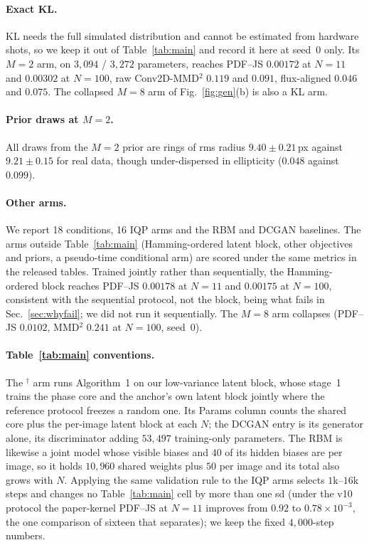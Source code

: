 \documentclass{article}
\begin{document}
\paragraph{Exact KL.} KL needs the full simulated distribution and cannot be estimated from hardware
shots, so we keep it out of Table~\ref{tab:main} and record it here at seed~0 only. Its $M{=}2$ arm,
on $3{,}094$ / $3{,}272$ parameters, reaches PDF--JS $0.00172$ at $N{=}11$ and $0.00302$ at
$N{=}100$, raw Conv2D-MMD$^2$ $0.119$ and $0.091$, flux-aligned $0.046$ and $0.075$. The collapsed
$M{=}8$ arm of Fig.~\ref{fig:gen}(b) is also a KL arm.

\paragraph{Prior draws at $M{=}2$.} All draws from the $M{=}2$ prior are rings of rms radius
$9.40 \pm 0.21$\,px against $9.21 \pm 0.15$ for real data, though under-dispersed in ellipticity
($0.048$ against $0.099$).

\paragraph{Other arms.} We report 18 conditions, 16 IQP arms and the RBM and DCGAN baselines. The arms
outside Table~\ref{tab:main} (Hamming-ordered latent block, other objectives and priors, a
pseudo-time conditional arm) are scored under the same metrics in the released tables. Trained jointly
rather than sequentially, the Hamming-ordered block reaches PDF--JS $0.00178$ at $N{=}11$ and
$0.00175$ at $N{=}100$, consistent with the sequential protocol, not the block, being what fails in
Sec.~\ref{sec:whyfail}; we did not run it sequentially. The $M{=}8$ arm collapses (PDF--JS $0.0102$,
MMD$^2$ $0.241$ at $N{=}100$, seed~0).

\paragraph{Table~\ref{tab:main} conventions.} The $^{\dagger}$ arm runs Algorithm~1 on our
low-variance latent block, whose stage~1 trains the phase core and the anchor's own latent block
jointly where the reference protocol freezes a random one. Its Params column counts the shared core
plus the per-image latent block at each $N$; the DCGAN entry is its generator alone, its
discriminator adding $53{,}497$ training-only parameters. The RBM is likewise a joint model whose
visible biases and $40$ of its hidden biases are per image, so it holds $10{,}960$ shared weights
plus $50$ per image and its total also grows with $N$. Applying the same validation rule to the IQP
arms selects $1$k--$16$k steps and changes no Table~\ref{tab:main} cell by more than one sd (under
the v10 protocol the paper-kernel PDF--JS at $N{=}11$ improves from $0.92$ to
$0.78 \times 10^{-3}$, the one comparison of sixteen that separates); we keep the fixed
$4{,}000$-step numbers.
\end{document}
